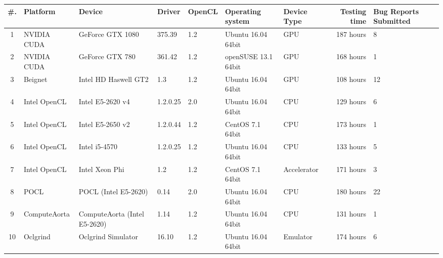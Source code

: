 \begin{tabular}{ cllllll | rR{1.4cm} }
\toprule
\textbf{\#. } & \textbf{Platform} & \textbf{Device} & \textbf{Driver} & \textbf{OpenCL} & 
\textbf{Operating system} & \textbf{Device Type} & \textbf{Testing time} & \textbf{Bug Reports Submitted} \\
 & NVIDIA CUDA & GeForce GTX 1080 & 375.39 & 1.2 & Ubuntu 16.04 64bit & GPU & 187 hours & 8 \\
2 & NVIDIA CUDA & GeForce GTX 780 & 361.42 & 1.2 & openSUSE  13.1 64bit & GPU & 168 hours & 1 \\
3 & Beignet & Intel HD Haswell GT2 & 1.3 & 1.2 & Ubuntu 16.04 64bit & GPU & 108 hours & 12 \\
4 & Intel OpenCL & Intel E5-2620 v4 & 1.2.0.25 & 2.0 & Ubuntu 16.04 64bit & CPU & 129 hours & 6 \\
5 & Intel OpenCL & Intel E5-2650 v2 & 1.2.0.44 & 1.2 & CentOS 7.1 64bit & CPU & 173 hours & 1 \\
6 & Intel OpenCL & Intel i5-4570 & 1.2.0.25 & 1.2 & Ubuntu 16.04 64bit & CPU & 133 hours & 5 \\
7 & Intel OpenCL & Intel Xeon Phi & 1.2 & 1.2 & CentOS 7.1 64bit & Accelerator & 171 hours & 3 \\
8 & POCL & POCL (Intel E5-2620) & 0.14 & 2.0 & Ubuntu 16.04 64bit & CPU & 180 hours & 22 \\
9 & ComputeAorta & ComputeAorta (Intel E5-2620) & 1.14 & 1.2 & Ubuntu 16.04 64bit & CPU & 131 hours & 1 \\
10 & Oclgrind & Oclgrind Simulator & 16.10 & 1.2 & Ubuntu 16.04 64bit & Emulator & 174 hours & 6 \\

\bottomrule
\end{tabular}

